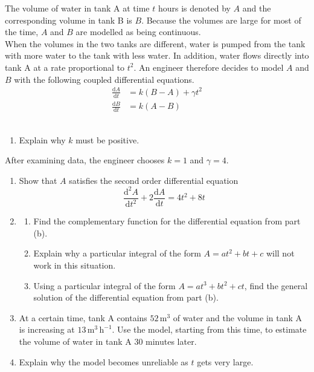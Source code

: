 \documentclass[leqno]{article}
\begin{document}
\begin{enumerate}[
  label=\textbf{\arabic*.},
  leftmargin=*,
  topsep=0pt,
  partopsep=0pt,
  parsep=0pt
]
The volume of water in tank A at time $t$ hours is denoted by $A$ and the corresponding volume in tank B is $B$. Because the volumes are large for most of the time, $A$ and $B$ are modelled as being continuous. \\

When the volumes in the two tanks are different, water is pumped from the tank with more water to the tank with less water. In addition, water flows directly into tank A at a rate proportional to $t^2$. An engineer therefore decides to model $A$ and $B$ with the following coupled differential equations. \\

\begin{align*}
\frac{\mathrm{d}A}{\mathrm{d}t}&=k(B-A)+\gamma t^2 \\
\frac{\mathrm{d}B}{\mathrm{d}t}&=k(A-B)
\end{align*} \\

\begin{enumerate}[label=\textbf{(\alph*)}]
  \item Explain why $k$ must be positive.  \\
\end{enumerate}
After examining data, the engineer chooses $k=1$ and $\gamma=4$. \\
\begin{enumerate}[label=\textbf{(\alph*)}, resume]
  \item Show that $A$ satisfies the second order differential equation
  \[
  \frac{\mathrm{d}^2 A}{\mathrm{d}t^2}+2\frac{\mathrm{d}A}{\mathrm{d}t}=4t^2+8t
  \]
  \item
  \begin{enumerate}[label=(\roman*)]
    \item Find the complementary function for the differential equation from part (b). 
    \item Explain why a particular integral of the form $A=at^2+bt+c$ will not work in this situation. 
    \item Using a particular integral of the form $A=at^3+bt^2+ct$, find the general solution of the differential equation from part (b).  \\
  \end{enumerate}
  \item At a certain time, tank A contains $52\,\mathrm{m^3}$ of water and the volume in tank A is increasing at $13\,\mathrm{m^3\,h^{-1}}$. Use the model, starting from this time, to estimate the volume of water in tank A $30$ minutes later.  \\
  \item Explain why the model becomes unreliable as $t$ gets very large.  \\
\end{enumerate}
\end{enumerate}
\end{document}

